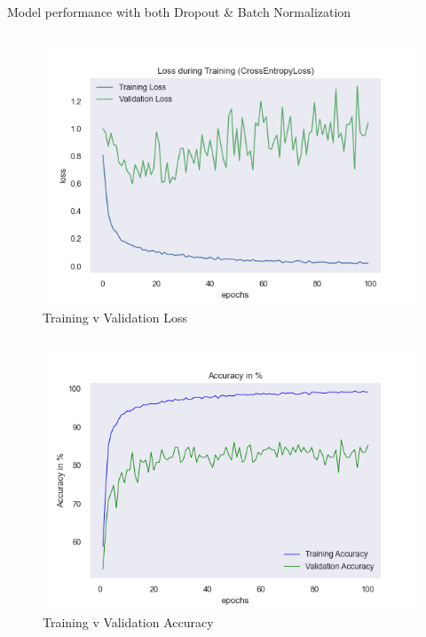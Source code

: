 \documentclass[aspectratio=169]{beamer}
\begin{document}
{    
    \begin{frame}{Model performance with both Dropout \& Batch Normalization}
        \begin{column}{.5\textwidth}
            \begin{figure}
                \centering
                \includegraphics[width=1\textwidth]{img/baptiste_100epoches_val_loss__Dropouts_True__BatchNorm_True.png}
                \caption{Training v Validation Loss}
            \end{figure}
        \end{column}
        \begin{column}{.5\textwidth}
            \begin{figure}
                \centering
                \includegraphics[width=1\textwidth]{img/baptiste_100epoches_train_accuracy__Dropouts_True__BatchNorm_True.png}
                \caption{Training v Validation Accuracy}
            \end{figure}
        \end{column}
    \end{frame}

}
\end{document}

